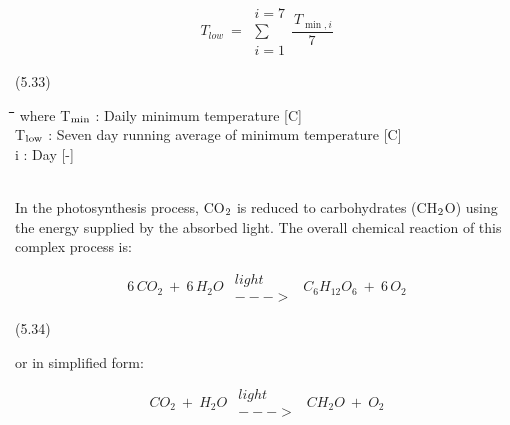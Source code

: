\begin{displaymath}
T _{low} ~=~\begin{array}{c}{i=7}  \\
\sum  \\
{i=1}\end{array}{\frac{\, T _{\min ,i} }{7}}
\end{displaymath}


\strut\hfill (5.33)

\nwln
\begin{tabbing}
\hspace{1.27cm}\=\hspace{1.27cm}\=\hspace{1.27cm}\=\hspace{1.27cm}\=%
\hspace{1.27cm}\=\hspace{1.27cm}\=\hspace{1.27cm}\=\hspace{1.27cm}\=%
\hspace{1.27cm}\=\hspace{1.27cm}\=\kill
where T$_{{\rm min}}$  : Daily minimum temperature        [\degrees C]\\
T$_{{\rm low}}$ : Seven day running average of minimum tempera\-ture        [\degrees C]\\
i : Day        [-]
\end{tabbing}



\\
In the photosynthesis process, CO$_{{\rm 2}}$ is reduced to carbohydrates (CH$_{{\rm 2}}$O) using the energy
supplied by the absorbed light. The overall chemical reaction of this complex process is:

\begin{displaymath}
6\, CO _{2} ~+~ 6\, H _{2} O ~\,\begin{array}{c}{light}  \\
{--->}\end{array} \, ~C _{6} H _{12} O _{6} ~+~ 6\, O _{2}
\end{displaymath}

 
\strut\hfill (5.34)



or in simplified form:

\begin{displaymath}
CO _{2} ~+~ H _{2} O~\,\begin{array}{c}{light}  \\
{--->}\end{array} \, ~ CH _{2} O ~+~ O _{2}
\end{displaymath}

